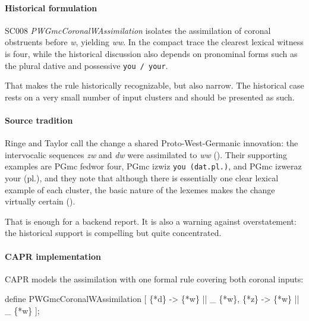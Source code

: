 \documentclass[
  british,
  a4paper,
]{article}
\newenvironment{Shaded}{}{}
\newcommand{\NormalTok}[1]{#1}
\begin{document}
\paragraph{Historical formulation}\label{historical-formulation-5}

SC008 \emph{PWGmcCoronalWAssimilation} isolates the assimilation of
coronal obstruents before \emph{w}, yielding \emph{ww}. In the compact
trace the clearest lexical witness is four, while the historical
discussion also depends on pronominal forms such as the plural dative
and possessive \texttt{you\ /\ your}.

That makes the rule historically recognizable, but also narrow. The
historical case rests on a very small number of input clusters and
should be presented as such.

\paragraph{Source tradition}\label{source-tradition-5}

Ringe and Taylor call the change a shared Proto-West-Germanic
innovation: the intervocalic sequences \emph{zw} and \emph{dw} were
assimilated to \emph{ww} (). Their supporting examples are PGmc fedwor four,
PGmc izwiz \texttt{you\ (dat.pl.)}, and PGmc izweraz your (pl.), and
they note that although there is essentially one clear lexical example
of each cluster, the basic nature of the lexemes makes the change
virtually certain ().

That is enough for a backend report. It is also a warning against
overstatement: the historical support is compelling but quite
concentrated.

\paragraph{CAPR implementation}\label{capr-implementation-5}

CAPR models the assimilation with one formal rule covering both coronal
inputs:

\begin{Shaded}
\begin{Highlighting}[]
\NormalTok{define PWGmcCoronalWAssimilation [}
\NormalTok{    \{*d\} {-}\textgreater{} \{*w\} || \_ \{*w\},}
\NormalTok{    \{*z\} {-}\textgreater{} \{*w\} || \_ \{*w\}}
\NormalTok{];}
\end{Highlighting}
\end{Shaded}
\end{document}
